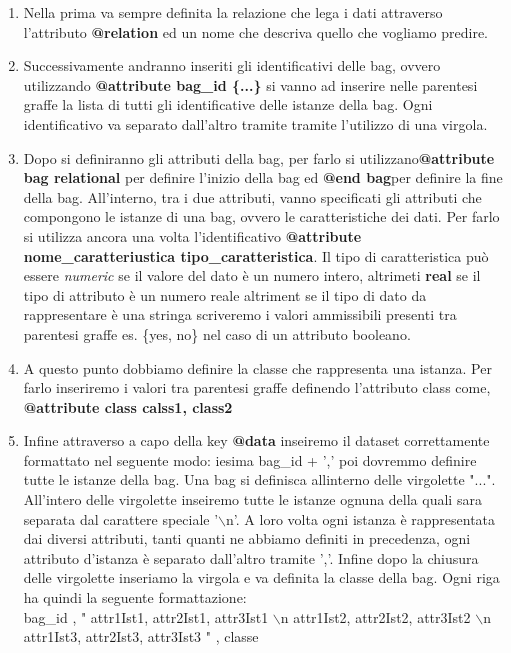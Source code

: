 \begin{enumerate}
        \item Nella prima va sempre definita la relazione che lega i dati attraverso l'attributo \textbf{@relation} ed un nome che descriva quello che vogliamo predire.  
        
        \item Successivamente andranno inseriti gli identificativi delle bag, ovvero utilizzando \textbf{@attribute bag\_id \{...\}} si vanno ad inserire nelle parentesi graffe la lista di tutti gli identificative delle istanze della bag. Ogni identificativo va separato dall'altro tramite tramite l'utilizzo di una virgola. 
        
        \item Dopo si definiranno gli attributi della bag, per farlo si utilizzano\textbf{@attribute bag relational} per definire l'inizio della bag ed \textbf{@end bag}per definire la fine della bag. All'interno, tra i due attributi, vanno specificati gli attributi che compongono le istanze di una bag, ovvero le caratteristiche dei dati. Per farlo si utilizza ancora una volta l'identificativo \textbf{@attribute nome\_caratteriustica tipo\_caratteristica}. Il tipo di caratteristica può essere \textit{numeric} se il valore del dato è un numero intero, altrimeti \textbf{real} se il tipo di attributo è un numero reale altriment se il tipo di dato da rappresentare è una stringa scriveremo i valori ammissibili presenti tra parentesi graffe es. {\{yes, no\}} nel caso di un attributo booleano.
        
        \item A questo punto dobbiamo definire la classe che rappresenta una istanza. Per farlo inseriremo i valori tra parentesi graffe definendo l'attributo class come, \textbf{@attribute class {calss1, class2}}
        
        \item Infine attraverso a capo della key \textbf{@data} inseiremo il dataset correttamente formattato nel seguente modo: iesima bag\_id + ',' poi dovremmo definire tutte le istanze della bag. Una bag si definisca allinterno delle virgolette "...". All'intero delle virgolette inseiremo tutte le istanze ognuna della quali sara separata dal carattere speciale '$\backslash$n'. A loro volta ogni istanza è rappresentata dai diversi attributi, tanti quanti ne abbiamo definiti in precedenza, ogni attributo d'istanza è separato dall'altro tramite ','. Infine dopo la chiusura delle virgolette inseriamo la virgola e va definita la classe della bag. Ogni riga ha quindi la seguente formattazione:
        \\\footnotesize {
        bag\_id , " attr1Ist1, attr2Ist1, attr3Ist1 $\backslash$n attr1Ist2, attr2Ist2, attr3Ist2 $\backslash$n attr1Ist3, attr2Ist3, attr3Ist3 " , classe  }
    \end{enumerate}
